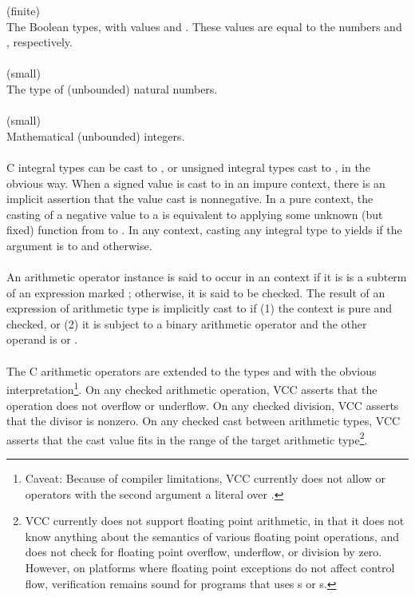 \documentclass[preprint,nocopyrightspace]{sigplanconf}
\begin{document}
{{\vcc{\bool} (finite)\\
The Boolean types, with values \vcc{\true} and \vcc{\false}. These
values are equal to the \vcc{\natural} numbers  and , respectively.
\\\\
\vcc{\natural} (small)\\
The type of (unbounded) natural numbers. 
\\\\
\vcc{\integer} (small)\\
Mathematical (unbounded) integers. 
\\\\
C integral types can be cast to \vcc{\integer},
or unsigned integral types cast to \vcc{\natural}, in the obvious
way. When a signed value is cast to \vcc{\natural} in an impure
context, there is an implicit assertion that the value cast is
nonnegative. In a pure context, the casting of a negative value to 
a \vcc{\natural} is equivalent to applying some unknown (but fixed)
function from  to . In any context, casting
any integral type to \vcc{\bool} yields \vcc{\true} if the argument
is \vcc{==} to  and \vcc{\false} otherwise.
\\\\
An arithmetic operator instance is said to occur in
an \vcc{\unchecked} context if it is is a subterm of an expression
marked ; otherwise, it is said to be checked. The
result of an expression of arithmetic type is implicitly cast
to \vcc{\integer} if (1) the context is pure and checked, or (2) it is
subject to a binary arithmetic operator and the other operand
is \vcc{\natural} or \vcc{\integer}.
\\\\
The C arithmetic operators are extended to the types \vcc{\natural}
and \vcc{\integer} with the obvious interpretation\footnote{
Caveat: Because of compiler limitations, VCC currently does not allow
\vcc{<<} or \vcc{>>} operators with the second argument a literal over .
}. 
On any checked arithmetic operation, VCC asserts that the operation
does not overflow or underflow. On any checked division, VCC asserts
that the divisor is nonzero. On any checked cast between arithmetic
types, VCC asserts that the cast value fits in the range of the target
arithmetic type\footnote{
VCC currently does not support floating point arithmetic, in that it
does not know anything about the semantics of various floating point
operations, and does not check for floating point overflow, underflow,
or division by zero. However, on platforms where floating point
exceptions do not affect control flow, verification remains sound for
programs that uses s or s.
}.

}}
\end{document}
